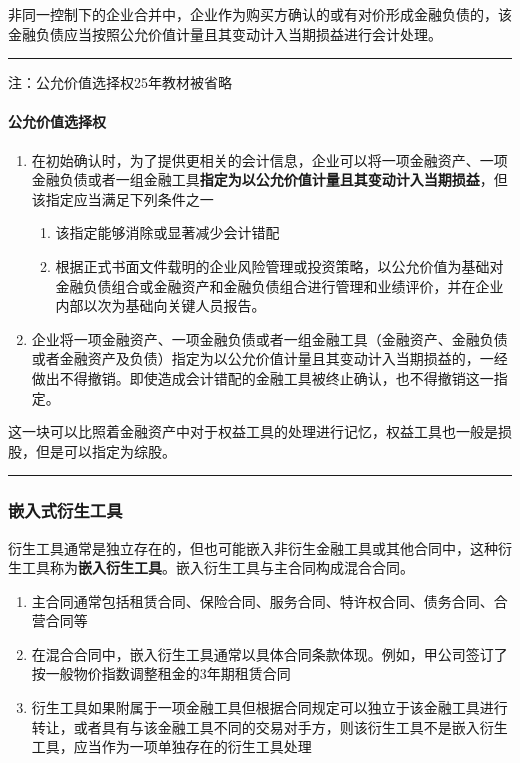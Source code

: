 \documentclass[UTF8,12pt]{ctexart}
\numberwithin{equation}{section} %
\numberwithin{figure}{section}
\numberwithin{table}{section}
\begin{document}
	非同一控制下的企业合并中，企业作为购买方确认的或有对价形成金融负债的，该金融负债应当按照公允价值计量且其变动计入当期损益进行会计处理。
	
	\vspace{5pt}
	\hrule
	\vspace{5pt}
	注：公允价值选择权25年教材被省略
	
	\paragraph{公允价值选择权}
	\begin{enumerate}
		\item 在初始确认时，为了提供更相关的会计信息，企业可以将一项金融资产、一项金融负债或者一组金融工具\textbf{指定为以公允价值计量且其变动计入当期损益}，但该指定应当满足下列条件之一
		\begin{enumerate}
			\item 该指定能够消除或显著减少会计错配
			
			\item 根据正式书面文件载明的企业风险管理或投资策略，以公允价值为基础对金融负债组合或金融资产和金融负债组合进行管理和业绩评价，并在企业内部以次为基础向关键人员报告。
		\end{enumerate}
		
		\item 企业将一项金融资产、一项金融负债或者一组金融工具（金融资产、金融负债或者金融资产及负债）指定为以公允价值计量且其变动计入当期损益的，一经做出不得撤销。即使造成会计错配的金融工具被终止确认，也不得撤销这一指定。
	\end{enumerate}
	
	这一块可以比照着金融资产中对于权益工具的处理进行记忆，权益工具也一般是损股，但是可以指定为综股。
	
	\vspace{5pt}
	\hrule
	\vspace{5pt}
	
	\subsubsection{嵌入式衍生工具}
	衍生工具通常是独立存在的，但也可能嵌入非衍生金融工具或其他合同中，这种衍生工具称为\textbf{嵌入衍生工具}。嵌入衍生工具与主合同构成混合合同。
	\begin{enumerate}
		\item 主合同通常包括租赁合同、保险合同、服务合同、特许权合同、债务合同、合营合同等
		
		\item 在混合合同中，嵌入衍生工具通常以具体合同条款体现。例如，甲公司签订了按一般物价指数调整租金的3年期租赁合同
		
		\item 衍生工具如果附属于一项金融工具但根据合同规定可以独立于该金融工具进行转让，或者具有与该金融工具不同的交易对手方，则该衍生工具不是嵌入衍生工具，应当作为一项单独存在的衍生工具处理
	\end{enumerate}
	
\end{document}
